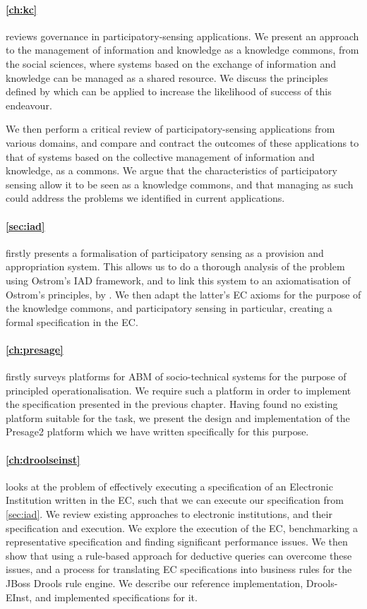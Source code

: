 \paragraph{\autoref{ch:kc}}
reviews governance in participatory-sensing
applications. We present an approach to the management of information and knowledge as a knowledge commons, from
the social sciences, where systems based on the exchange of
information and knowledge can be managed as a shared resource. We discuss the
principles defined by \citet{Ostrom1990} which can be applied to increase the
likelihood of success of this endeavour. 

We then perform a critical review of participatory-sensing applications from
various domains, and compare and contract the outcomes of these applications
to that of systems based on the collective management of information and
knowledge, as a commons. We argue that the characteristics of participatory
sensing allow it to be seen as a knowledge commons, and that managing as such
could address the problems we identified in current applications.

\paragraph{\autoref{sec:iad}}
firstly presents a formalisation of participatory sensing as a provision and
appropriation system. This allows us to do a thorough
analysis of the problem using Ostrom's \ac{IAD} framework, and to link this
system to an axiomatisation of Ostrom's principles, by \citet{Pitt2012b}.
We then adapt the latter's \ac{EC} axioms for the purpose of the
knowledge commons, and participatory sensing in particular, creating a formal specification in the \ac{EC}.

\paragraph{\autoref{ch:presage}} firstly surveys platforms for \ac{ABM} of
socio-technical systems for the purpose of principled operationalisation. We
require such a platform in order to implement the specification presented in
the previous chapter. Having found no existing platform suitable for the task,
we present the design and implementation of the Presage2 platform which we
have written specifically for this purpose.

\paragraph{\autoref{ch:droolseinst}} looks at the problem of effectively
executing a specification of an Electronic Institution written in the \ac{EC},
such that we can execute our specification from \autoref{sec:iad}. We review
existing approaches to electronic institutions, and their specification and
execution. We explore the execution of the \ac{EC}, benchmarking a
representative specification and finding significant performance issues. We
then show that using a rule-based approach for deductive queries can overcome
these issues, and a process for translating \ac{EC} specifications into
business rules for the JBoss Drools rule engine. We describe our reference
implementation, Drools-EInst, and implemented specifications for it.

